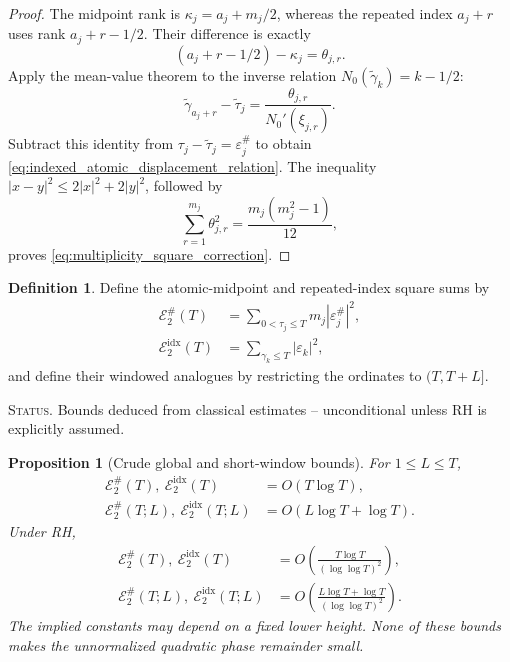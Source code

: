 \documentclass[11pt]{amsart}
\numberwithin{equation}{section}
\theoremstyle{plain}
\newtheorem{proposition}[theorem]{Proposition}
\theoremstyle{definition}
\newtheorem{definition}[theorem]{Definition}
\theoremstyle{remark}
\newcommand{\1}{\mathbf{1}}
\newcommand{\statusnote}[1]{%
  \par\smallskip\noindent
  \begingroup\footnotesize\textsc{Status.} #1\endgroup
  \par\smallskip}
\begin{document}
\begin{proof}
The midpoint rank is
\(\kappa_j=a_j+m_j/2\), whereas the repeated index \(a_j+r\)
uses rank \(a_j+r-1/2\).  Their difference is exactly
\begin{equation}
(a_j+r-1/2)-\kappa_j=\theta_{j,r}.
\label{eq:rank_difference_exact}
\end{equation}
Apply the mean-value theorem to the inverse relation
\(N_0(\widetilde\gamma_k)=k-1/2\):
\begin{equation}
\widetilde\gamma_{a_j+r}-\widetilde\tau_j
=
\frac{\theta_{j,r}}{N_0'(\xi_{j,r})}.
\label{eq:smooth_clock_rank_mvt}
\end{equation}
Subtract this identity from
\(\tau_j-\widetilde\tau_j=\varepsilon_j^{\#}\) to obtain
\eqref{eq:indexed_atomic_displacement_relation}.  The inequality
\(|x-y|^2\leq2|x|^2+2|y|^2\), followed by
\begin{equation}
\sum_{r=1}^{m_j}\theta_{j,r}^2
=
\frac{m_j(m_j^2-1)}{12},
\label{eq:centered_rank_square_sum}
\end{equation}
proves \eqref{eq:multiplicity_square_correction}.
\end{proof}

\begin{definition}
\label{def:rvm_square_sums}
Define the atomic-midpoint and repeated-index square sums by
\begin{align}
\mathscr E_2^{\#}(T)
&=
\sum_{0<\tau_j\leq T}m_j|\varepsilon_j^{\#}|^2,
\label{eq:rvm_E2_atomic_global}
\\
\mathscr E_2^{\mathrm{idx}}(T)
&=
\sum_{\gamma_k\leq T}|\varepsilon_k|^2,
\label{eq:rvm_E2_index_global}
\end{align}
and define their windowed analogues by restricting the ordinates to
\((T,T+L]\).
\end{definition}

\statusnote{Bounds deduced from classical estimates -- unconditional unless RH is explicitly assumed.}
\begin{proposition}[Crude global and short-window bounds]
\label{prop:rvm_displacement_square_bounds}
For \(1\leq L\leq T\),
\begin{align}
\mathscr E_2^{\#}(T),\ \mathscr E_2^{\mathrm{idx}}(T)
&=O(T\log T),
\label{eq:rvm_E2_unconditional_global}
\\
\mathscr E_2^{\#}(T;L),\ \mathscr E_2^{\mathrm{idx}}(T;L)
&=O(L\log T+\log T).
\label{eq:rvm_E2_unconditional_window}
\end{align}
Under RH,
\begin{align}
\mathscr E_2^{\#}(T),\ \mathscr E_2^{\mathrm{idx}}(T)
&=
O\!\left(\frac{T\log T}{(\log\log T)^2}\right),
\label{eq:rvm_E2_RH_global}
\\
\mathscr E_2^{\#}(T;L),\ \mathscr E_2^{\mathrm{idx}}(T;L)
&=
O\!\left(
\frac{L\log T+\log T}{(\log\log T)^2}
\right).
\label{eq:rvm_E2_RH_window}
\end{align}
The implied constants may depend on a fixed lower height.  None of these
bounds makes the unnormalized quadratic phase remainder small.
\end{proposition}
\end{document}
